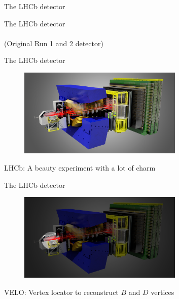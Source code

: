 \documentclass[dvipsnames]{beamer}
\begin{document}
\begin{frame}{The LHCb detector}
  \begin{center}
    {\huge The LHCb detector}\\~\\
    {\large (Original Run 1 and 2 detector)}
  \end{center}
\end{frame}

\begin{frame}{The LHCb detector}
  \begin{figure}
    \centering
    \includegraphics[width = 0.7\textwidth]{Plots/LHCbDetector.png}
  \end{figure}
  \begin{center}
    \Large LHCb: A beauty experiment with a lot of charm
  \end{center}
\end{frame}

\begin{frame}{The LHCb detector}
  \begin{figure}
    \centering
    \includegraphics[width = 0.7\textwidth]{Plots/LHCbDetector_VELO.png}
  \end{figure}
  \begin{center}
    \Large VELO: Vertex locator to reconstruct $B$ and $D$ vertices\phantom{y}
  \end{center}
\end{frame}
\end{document}
